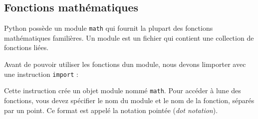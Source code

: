 \begin{Shaded}
\begin{Highlighting}[]
\OperatorTok{\textgreater{}\textgreater{}\textgreater{}} \NormalTok{(}\NormalTok{)}
\CommentTok{\textquotesingle{}32\textquotesingle{}}
\OperatorTok{\textgreater{}\textgreater{}\textgreater{}} \NormalTok{(}\NormalTok{)}
\CommentTok{\textquotesingle{}3.14159\textquotesingle{}}
\end{Highlighting}
\end{Shaded}

\hypertarget{fonctions-mathuxe9matiques}{%
\subsection{Fonctions mathématiques}\label{fonctions-mathuxe9matiques}}

Python possède un module \texttt{math} qui fournit la plupart des
fonctions mathématiques familières. Un module est un fichier qui
contient une collection de fonctions liées.

Avant de pouvoir utiliser les fonctions d\textquotesingle un module,
nous devons l\textquotesingle importer avec une instruction
\texttt{import} :

\begin{Shaded}
\begin{Highlighting}[]
\OperatorTok{\textgreater{}\textgreater{}\textgreater{}} 
\end{Highlighting}
\end{Shaded}

Cette instruction crée un objet module nommé \texttt{math}. Pour accéder
à l\textquotesingle une des fonctions, vous devez spécifier le nom du
module et le nom de la fonction, séparés par un point. Ce format est
appelé la notation pointée (\emph{dot notation}).

\begin{Shaded}
\begin{Highlighting}[]
\OperatorTok{\textgreater{}\textgreater{}\textgreater{}}\OperatorTok{=}\OperatorTok{/}
\OperatorTok{\textgreater{}\textgreater{}\textgreater{}}\OperatorTok{=}  \OperatorTok{*}
\OperatorTok{\textgreater{}\textgreater{}\textgreater{}}\OperatorTok{=} 
\OperatorTok{\textgreater{}\textgreater{}\textgreater{}}\OperatorTok{=}
\end{Highlighting}
\end{Shaded}

